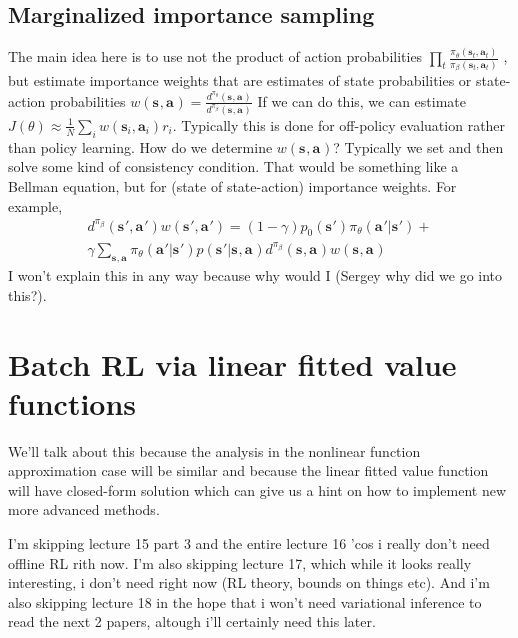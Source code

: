 \documentclass{report}
\begin{document}
\subsection{Marginalized importance sampling}
The main idea here is to use not the product of action probabilities $ \prod_{t}^{} \frac{\pi_{ \theta }(\bm{s}_{t}, \bm{a}_{t} )}{\pi_{ \beta }(\bm{s}_{t}, \bm{a}_{t} )}    $ , but estimate importance
weights that are estimates of state probabilities or state-action probabilities 
$ w (\bm{s}_{}, \bm{a}_{} ) = \frac{d^{ \pi_{ \theta } } (\bm{s}_{}, \bm{a}_{} )}{d^{ \pi_{ \beta } }(\bm{s}_{}, \bm{a}_{} )}  $
If we can do this, we can estimate $ J (\theta) \approx \frac{1}{N}  \sum_{i}^{} w (\bm{s}_{i}, \bm{a}_{i} )r_{ i }  $.
Typically this is done for off-policy evaluation rather than policy learning.
How do we determine $ w (\bm{s}_{}, \bm{a}_{} )  $? Typically we set and then solve some kind of consistency condition.
That would be something like a Bellman equation, but for (state of state-action) importance weights.
For example,
\begin{equation}
		\begin{split}
d^{ \pi_{ \beta } } (\bm{s}_{}', \bm{a}_{} ') w (\bm{s}_{}', \bm{a}_{}' ) =
(1 -\gamma ) p_{ 0 } (\bm{s}_{}') \pi_{ \theta } (\bm{a}_{}'| \bm{s}_{} ') +\\
\gamma \sum_{\bm{s}_{}, \bm{a}_{}}^{} \pi_{ \theta } (\bm{a}_{}'| \bm{s}_{}' ) p (\bm{s}_{}'|\bm{s}_{}, \bm{a}_{}) d^{ \pi_{ \beta } }
(\bm{s}_{}, \bm{a}_{} ) w (\bm{s}_{}, \bm{a}_{} )
		\end{split}
\end{equation}
I won't explain this in any way because why would I (Sergey why did we go into this?).

\section{Batch RL via linear fitted value functions}
We'll talk about this because the analysis in the nonlinear function approximation case will be similar
and because the linear fitted value function will have closed-form solution which can give us a hint
on how to implement new more advanced methods.

I'm skipping lecture 15 part 3 and the entire lecture 16 'cos i really don't need offline RL rith now.
I'm also skipping lecture 17, which while it looks really interesting, i don't need right now (RL theory, bounds on things etc).
And i'm also skipping lecture 18 in the hope that i won't need variational inference to read the next 2 papers,
altough i'll certainly need this later.
\end{document}
